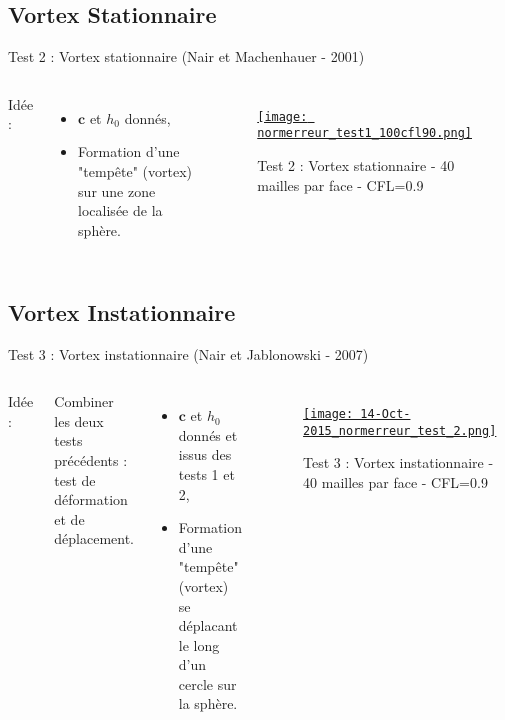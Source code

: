 \documentclass[11pt]{beamer}
\begin{document}
\subsection{Vortex Stationnaire}
\begin{frame}{Test 2 : Vortex stationnaire (Nair et Machenhauer - 2001)}
\begin{columns}
Idée :

\begin{itemize}
\item $\mathbf{c}$ et $h_0$ donnés,

\item Formation d'une "tempête" (vortex) sur une zone localisée de la sphère.
\end{itemize}



\begin{figure}
\href{run:CSapprox_test1.avi}{\texttt{[image: normerreur\_test1\_100cfl90.png]}} 
\caption{Test 2 : Vortex stationnaire - 40 mailles par face - CFL=0.9}
\end{figure}
\end{columns}
\end{frame}


\subsection{Vortex Instationnaire}
\begin{frame}{Test 3 : Vortex instationnaire (Nair et Jablonowski - 2007)}
\begin{columns}
Idée :

Combiner les deux tests précédents : test de déformation et de déplacement.
\begin{itemize}

\item $\mathbf{c}$ et $h_0$ donnés et issus des tests 1 et 2,

\item Formation d'une "tempête" (vortex) se déplacant le long d'un cercle sur la sphère.
\end{itemize}



\begin{figure}
\href{run:CSapprox_test2.avi}{\texttt{[image: 14-Oct-2015\_normerreur\_test\_2.png]}} 
\caption{Test 3 : Vortex instationnaire - 40 mailles par face - CFL=0.9}
\end{figure}
\end{columns}
\end{frame}
\end{document}
